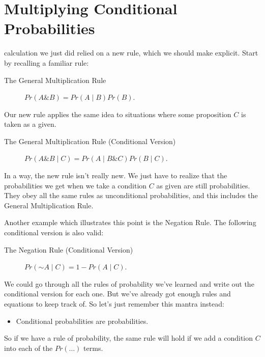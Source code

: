 \documentclass[justified]{tufte-book}
\newcommand{\given}{\mid}
\renewcommand{\neg}{\mathbin{\sim}}
\renewcommand{\wedge}{\mathbin{\&}}
\newcommand{\p}{Pr}
\newenvironment{info}{\begin{itemize}\item[\Info]}{\end{itemize}}
\theoremstyle{definition}
\theoremstyle{definition}
\theoremstyle{definition}
\theoremstyle{remark}
\begin{document}
\hypertarget{multiplying-conditional-probabilities}{%
\section{Multiplying Conditional Probabilities}\label{multiplying-conditional-probabilities}}

 calculation we just did relied on a new rule, which we should make explicit. Start by recalling a familiar rule:

\begin{description}
\item[The General Multiplication Rule]
\(\p(A \wedge B) = \p(A \given B) \p(B).\)
\end{description}

Our new rule applies the same idea to situations where some proposition \(C\) is taken as a given.

\begin{description}
\item[The General Multiplication Rule (Conditional Version)]
\(\p(A \wedge B \given C) = \p(A \given B \wedge C) \p(B \given C).\)
\end{description}

In a way, the new rule isn't really new. We just have to realize that the probabilities we get when we take a condition \(C\) as given are still probabilities. They obey all the same rules as unconditional probabilities, and this includes the General Multiplication Rule.

Another example which illustrates this point is the Negation Rule. The following conditional version is also valid:

\begin{description}
\item[The Negation Rule (Conditional Version)]
\(\p(\neg A \given C) = 1 - \p(A \given C).\)
\end{description}

We could go through all the rules of probability we've learned and write out the conditional version for each one. But we've already got enough rules and equations to keep track of. So let's just remember this mantra instead:

\begin{info}
Conditional probabilities are probabilities.
\end{info}

So if we have a rule of probability, the same rule will hold if we add a condition \(C\) into each of the \(\p(\ldots)\) terms.
\end{document}
